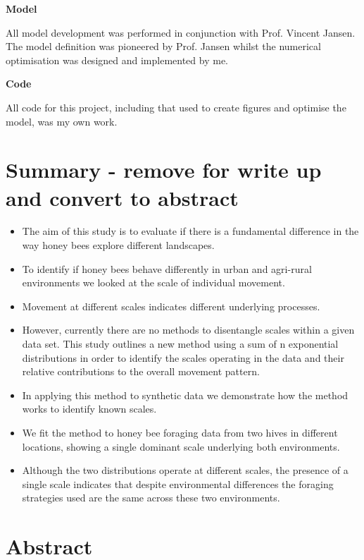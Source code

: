 \documentclass[11pt,usenames,dvipsnames,a4paper]{article}
\begin{document}
\noindent
\Large{\textbf{Model}}

\noindent
All model development was performed in conjunction with Prof. Vincent Jansen. The model definition was pioneered by Prof. Jansen whilst the numerical optimisation was designed and implemented by me.

\noindent
\Large{\textbf{Code}}

\noindent
All code for this project, including that used to create figures and optimise the model, was my own work.

\newpage
\tableofcontents
\newpage

\section{Summary - remove for write up and convert to abstract}

\begin{itemize}
	\item The aim of this study is to evaluate if there is a fundamental difference in the way honey bees explore different landscapes.
	\item To identify if honey bees behave differently in urban and agri-rural environments we looked at the scale of individual movement.
	\item Movement at different scales indicates different underlying processes.
	\item However, currently there are no methods to disentangle scales within a given data set. This study outlines a new method using a sum of n exponential distributions in order to identify the scales operating in the data and their relative contributions to the overall movement pattern.
	\item In applying this method to synthetic data we demonstrate how the method works to identify known scales.
	\item We fit the method to honey bee foraging data from two hives  in different locations, showing a single dominant scale underlying both environments.
	\item Although the two distributions operate at different scales, the presence of a single scale indicates that despite environmental differences the foraging strategies used are the same across these two environments.
	
\end{itemize}

\section{Abstract}
\end{document}
